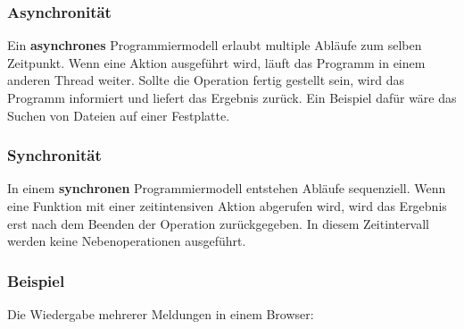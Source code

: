 \subsubsection{Asynchronität}
Ein \textbf{asynchrones} Programmiermodell erlaubt multiple Abläufe zum selben Zeitpunkt. Wenn eine Aktion ausgeführt wird, läuft das Programm in einem anderen \glqq Thread\grqq{} weiter. Sollte die Operation fertig gestellt sein, wird das Programm informiert und liefert das Ergebnis zurück. Ein Beispiel dafür wäre das Suchen von Dateien auf einer Festplatte.\cite{asynchronitaet} \\

\subsubsection{Synchronität}
In einem \textbf{synchronen} Programmiermodell entstehen Abläufe sequenziell. Wenn eine Funktion mit einer zeitintensiven Aktion abgerufen wird, wird das Ergebnis erst nach dem Beenden der Operation zurückgegeben. In diesem Zeitintervall werden keine Nebenoperationen ausgeführt.\cite{asynchronitaet} \\

\subsubsection{Beispiel}
Die Wiedergabe mehrerer Meldungen in einem Browser:

